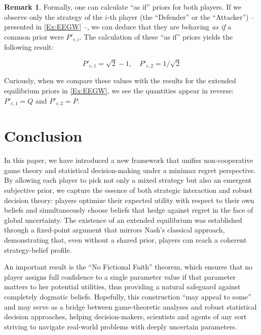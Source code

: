 \documentclass{article}
\theoremstyle{definition}
\newtheorem*{remark}{Remark}
\begin{document}
    \begin{remark}
    Formally, one can calculate ``as if'' priors for both players. 
    If we observe only the strategy of the $i$-th player (the ``Defender'' or the ``Attacker'') -- presented in \ref{Ex:EEGW} --, we can deduce that they are behaving \emph{as if} a common prior were $P'_{c,i}$. The calculation of these ``as if'' priors yields the following result:

    \begin{equation}
        P'_{c,1} = \sqrt{2} - 1, \quad
        P'_{c,2} = 1/\sqrt{2}
    \end{equation}

    Curiously, when we compare these values with the results for the extended equilibrium priors in \ref{Ex:EEGW}, we see the quantities appear in reverse: $P'_{c,1} = Q$ and $P'_{c,2} = P$.
    
\end{remark}




\section{Conclusion}

In this paper, we have introduced a new framework that unifies non-cooperative game theory and statistical decision-making under a minimax regret perspective. By allowing each player to pick not only a mixed strategy but also an emergent subjective prior, we capture the essence of both strategic interaction and robust decision theory: players optimize their expected utility with respect to their own beliefs and simultaneously choose beliefs that hedge against regret in the face of global uncertainty. The existence of an extended equilibrium was established through a fixed-point argument that mirrors Nash's classical approach, demonstrating that, even without a shared prior, players can reach a coherent strategy-belief profile.

An important result is the ``No Fictional Faith'' theorem, which ensures that no player assigns full confidence to a single parameter value if that parameter matters to her potential utilities, thus providing a natural safeguard against completely dogmatic beliefs. Hopefully, this construction ``may appeal to some'' and may serve as a bridge between game-theoretic analyses and robust statistical decision approaches, helping decision-makers, scientists and agents of any sort striving to navigate real-world problems with deeply uncertain parameters.
\end{document}
